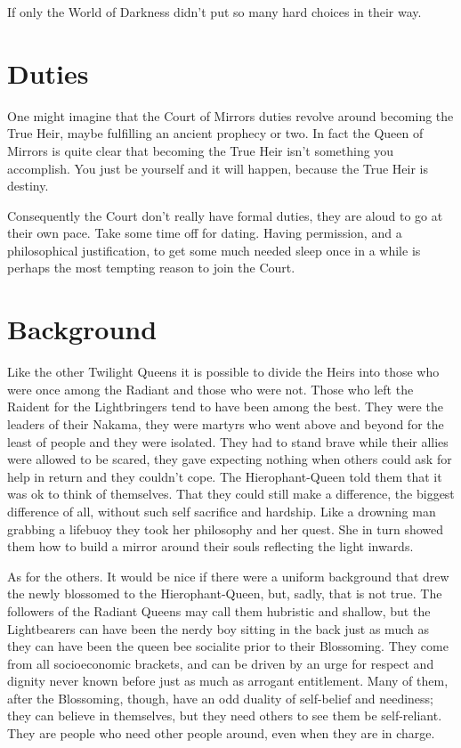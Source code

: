 If only the World of Darkness didn't put so many hard choices in their way.

\section*{Duties}

One might imagine that the Court of Mirrors duties revolve around becoming the True Heir, maybe fulfilling an ancient prophecy or two. In fact the Queen of Mirrors is quite clear that becoming the True Heir isn't something you accomplish. You just be yourself and it will happen, because the True Heir is destiny. 

Consequently the Court don’t really have formal duties, they are aloud to go at their own pace. Take some time off for dating. Having permission, and a philosophical justification, to get some much needed sleep once in a while is perhaps the most tempting reason to join the Court.

\section*{Background}
Like the other Twilight Queens it is possible to divide the Heirs into those who were once among the Radiant and those who were not. Those who left the Raident for the Lightbringers tend to have been among the best. They were the leaders of their Nakama, they were martyrs who went above and beyond for the least of people and they were isolated. They had to stand brave while their allies were allowed to be scared, they gave expecting nothing when others could ask for help in return and they couldn't cope. The Hierophant-Queen told them that it was ok to think of themselves. That they could still make a difference, the biggest difference of all, without such self sacrifice and hardship. Like a drowning man grabbing a lifebuoy they took her philosophy and her quest. She in turn showed them how to build a mirror around their souls reflecting the light inwards.

As for the others. It would be nice if there were a uniform background that drew the newly blossomed to the Hierophant-Queen, but, sadly, that is not true. The followers of the Radiant Queens may call them hubristic and shallow, but the Lightbearers can have been the nerdy boy sitting in the back just as much as they can have been the queen bee socialite prior to their Blossoming. They come from all socioeconomic brackets, and can be driven by an urge for respect and dignity never known before just as much as arrogant entitlement. Many of them, after the Blossoming, though, have an odd duality of self-belief and neediness; they can believe in themselves, but they need others to see them be self-reliant. They are people who need other people around, even when they are in charge.

